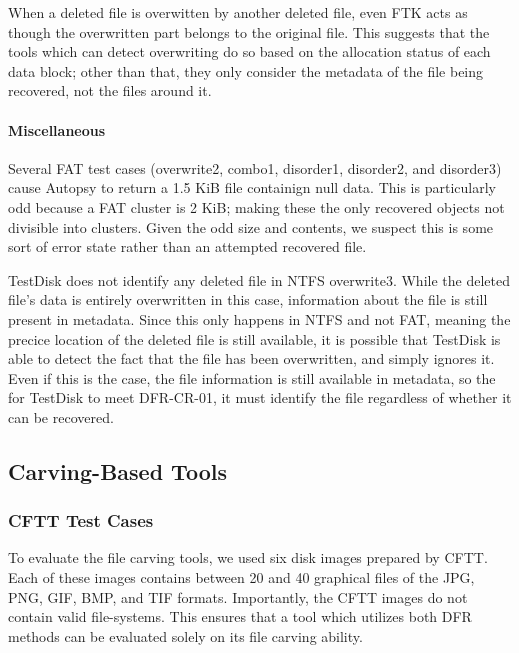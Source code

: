 When a deleted file is overwitten by another deleted file, even FTK acts as though the overwritten part belongs to the original file.
This suggests that the tools which can detect overwriting do so based on the allocation status of each data block; other than that, they only consider the metadata of the file being recovered, not the files around it.

\paragraph{Miscellaneous}
Several FAT test cases (overwrite2, combo1, disorder1, disorder2, and disorder3) cause Autopsy to return a 1.5 KiB file containign null data.
This is particularly odd because a FAT cluster is 2 KiB; making these the only recovered objects not divisible into clusters.
Given the odd size and contents, we suspect this is some sort of error state rather than an attempted recovered file.

TestDisk does not identify any deleted file in NTFS overwrite3.
While the deleted file's data is entirely overwritten in this case, information about the file is still present in metadata.
Since this only happens in NTFS and not FAT, meaning the precice location of the deleted file is still available, it is possible that TestDisk is able to detect the fact that the file has been overwritten, and simply ignores it.
Even if this is the case, the file information is still available in metadata, so the for TestDisk to meet DFR-CR-01, it must identify the file regardless of whether it can be recovered.


\subsection{Carving-Based Tools}

\subsubsection{CFTT Test Cases}
To evaluate the file carving tools, we used six disk images prepared by CFTT\cite{cftt_carving_images}.
Each of these images contains between 20 and 40 graphical files of the JPG, PNG, GIF, BMP, and TIF formats.
Importantly, the CFTT images do not contain valid file-systems.
This ensures that a tool which utilizes both DFR methods can be evaluated solely on its file carving ability.

